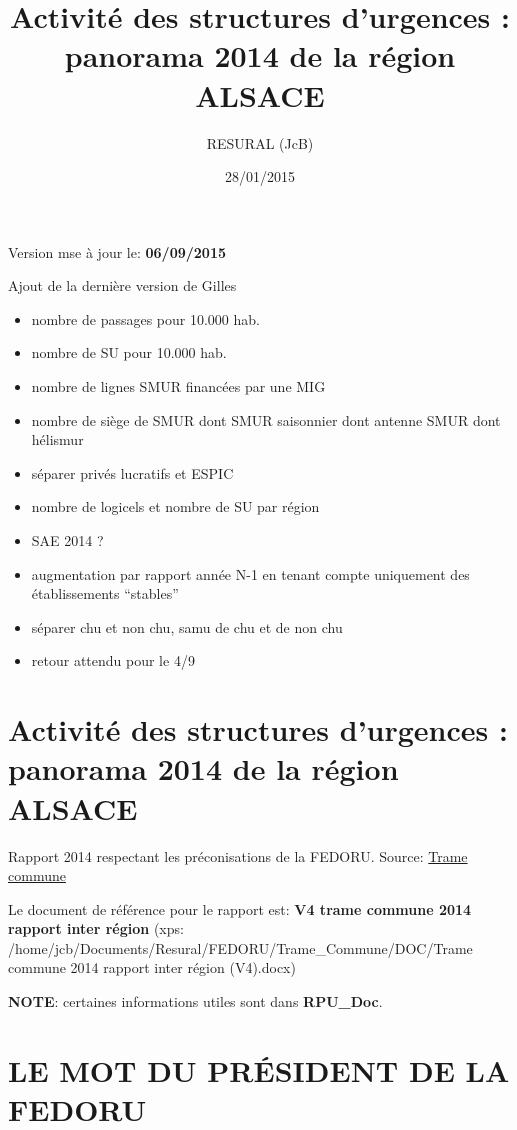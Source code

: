 \documentclass[]{article}
\title{Activité des structures d'urgences : panorama 2014 de la région ALSACE}
\author{RESURAL (JcB)}
\date{28/01/2015}
\begin{document}
\maketitle


{
\hypersetup{linkcolor=black}
\setcounter{tocdepth}{3}
\tableofcontents
}
Version mse à jour le: \textbf{06/09/2015}

Ajout de la dernière version de Gilles

\begin{itemize}
\itemsep1pt\parskip0pt
\item
  nombre de passages pour 10.000 hab.
\item
  nombre de SU pour 10.000 hab.
\item
  nombre de lignes SMUR financées par une MIG
\item
  nombre de siège de SMUR dont SMUR saisonnier dont antenne SMUR dont
  hélismur
\item
  séparer privés lucratifs et ESPIC
\item
  nombre de logicels et nombre de SU par région
\item
  SAE 2014 ?
\item
  augmentation par rapport année N-1 en tenant compte uniquement des
  établissements ``stables''
\item
  séparer chu et non chu, samu de chu et de non chu
\item
  retour attendu pour le 4/9
\end{itemize}

\section{Activité des structures d'urgences : panorama 2014 de la région
ALSACE}\label{activite-des-structures-durgences-panorama-2014-de-la-region-alsace}

Rapport 2014 respectant les préconisations de la FEDORU. Source:
\href{https://docs.google.com/document/d/101LYVqVLeHZnrujfMm3aqBYfbOwx3CPEB3Y-Lbud2Ls/edit}{Trame
commune}

Le document de référence pour le rapport est: \textbf{V4 trame commune
2014 rapport inter région} (xps:
/home/jcb/Documents/Resural/FEDORU/Trame\_Commune/DOC/Trame commune 2014
rapport inter région (V4).docx)

\textbf{NOTE}: certaines informations utiles sont dans
\textbf{RPU\_Doc}.

\section{LE MOT DU PRÉSIDENT DE LA
FEDORU}\label{le-mot-du-president-de-la-fedoru}
\end{document}
